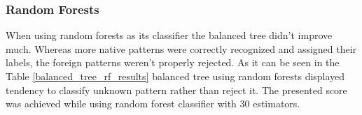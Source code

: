 \subsubsection{Random Forests}

When using random forests as its classifier the balanced tree didn't improve much. Whereas more native patterns were correctly recognized and assigned their labels, the foreign patterns weren't properly rejected. As it can be seen in the Table \ref{balanced_tree_rf_results} balanced tree using random forests displayed tendency to classify unknown pattern rather than reject it. The presented score was achieved while using random forest classifier with 30 estimators.

\begin{table}[htp]
	\centering
	\caption{Results for Balanced tree using Random Forests classifier with n\_estimators=30}
	\label{balanced_tree_rf_results}
\end{table}
